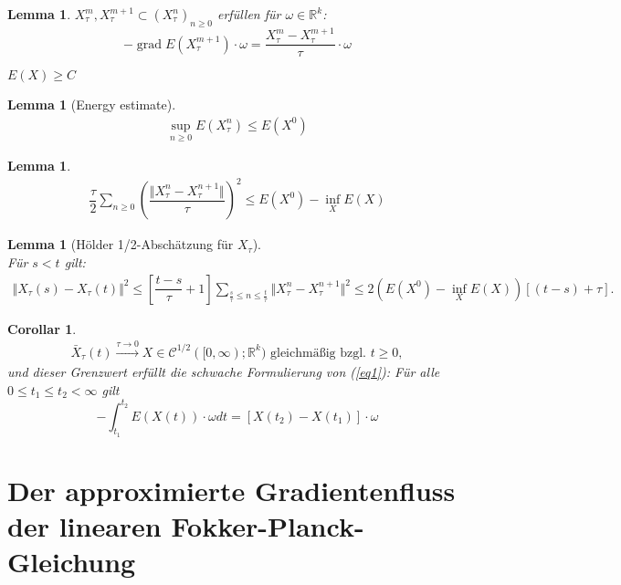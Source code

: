 \documentclass[11pt,a4paper,notitlepage]{scrreprt}
\newcommand{\RR}{\mathbb{R}}
\newcommand{\grad}{\operatorname{grad}}
\newtheorem{cor}[defi]{Corollar}
\newtheorem{lem}[defi]{Lemma}
\begin{document}
\begin{lem}
$X_\tau^m,X_\tau^{m+1}\subset(X_\tau^n)_{n\geq 0}$ erfüllen für $\omega\in\RR^k$: \\
\begin{equation}
-\grad E(X_\tau^{m+1})\cdot\omega= \dfrac{ X_\tau^m-X_\tau^{m+1}}{\tau}\cdot\omega
\end{equation}
\end{lem}

 
$E(X)\geq C$

\begin{lem}[Energy estimate]
\begin{eqnarray*}
\sup_{n\geq 0}E(X_\tau^n)\leq E(X^0) \label{enest}
\end{eqnarray*}
\end{lem}


\begin{lem}
\begin{eqnarray*}
\dfrac{\tau}{2}\sum_{n\geq 0} \left(\dfrac{\Vert X_\tau^n-X_\tau^{n+1}\Vert}{\tau}\right)^2\leq E(X^0)-\inf_X E(X)\label{totalsquare}
\end{eqnarray*}
\end{lem}


\begin{lem}[Hölder 1/2-Abschätzung für $X_\tau$]  $~~$ \\
Für $s<t$ gilt:
\begin{eqnarray*}
\Vert X_\tau(s)-X_\tau(t)\Vert^2 \leq \left[\dfrac{t-s}{\tau}+1\right] \sum_{\frac{s}{\tau}\leq n \leq \frac{t}{\tau}} \Vert X^n_\tau- X_\tau^{n+1}\Vert^2 \leq 2(E(X^0)-\inf_X E(X))[(t-s)+\tau]. \label{Hölder}
\end{eqnarray*}
\end{lem}

\begin{cor}
\begin{eqnarray}
\bar{X}_\tau(t) \overset{\tau\to0}{\to} X \in \mathcal{C}^{1/2}([0,\infty);\RR^k) \text{ gleichmäßig bzgl. }t\geq 0,
\end{eqnarray}
und dieser Grenzwert erfüllt die schwache Formulierung von (\ref{eq1}): Für alle $0\leq t_1\leq t_2<\infty$ gilt
\begin{equation}
-\int_{t_1}^{t_2}E(X(t))\cdot \omega dt = [X(t_2)-X(t_1)]\cdot\omega
\end{equation}
\end{cor}

\newpage
\section{Der approximierte Gradientenfluss der linearen Fokker-Planck-Gleichung}
\end{document}
